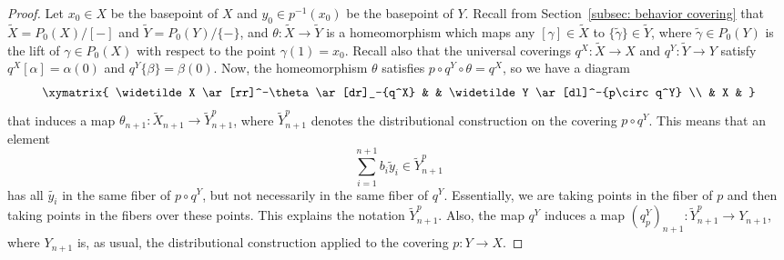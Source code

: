 \documentclass[amscd,amssymb,verbatim,11pt]{amsart}
\theoremstyle{plain}
\theoremstyle{definition}
\newcommand{\Wi}{\widetilde}
\begin{document}
\begin{proof}
    Let $x_0\in X$ be the basepoint of $X$ and $y_0\in p^{-1}(x_0)$ be the basepoint of $Y$. Recall from Section~\ref{subsec: behavior covering} that $\Wi{X}=P_0(X)/[-]$ and $\Wi{Y}=P_0(Y)/\{-\}$, and $\theta\colon \Wi X\to\Wi Y$ is a homeomorphism which maps any $[\gamma]\in \Wi X$ to $\{\Wi{\gamma}\}\in \Wi Y$, where $\Wi{\gamma}\in P_0(Y)$ is the lift of $\gamma\in P_0(X)$ with respect to the point $\gamma(1)=x_0$. Recall also that the universal coverings $q^X\colon \Wi X\to X$ and $q^Y\colon \Wi Y\to Y$ satisfy $q^X[\alpha]=\alpha(0)$ and $q^Y\{\beta\}=\beta(0)$. Now, the homeomorphism $\theta$ 
satisfies $p\circ q^Y \circ \theta = q^X$, so we have a diagram
$$\xymatrix{
\Wi X \ar[rr]^-\theta \ar[dr]_-{q^X} & & \Wi Y \ar[dl]^-{p\circ q^Y} \\
& X &
} 
$$
that induces a map $\theta_{n+1}\colon \Wi X_{n+1} \to \Wi Y^p_{n+1}$, where $\Wi Y^p_{n+1}$
denotes the distributional construction on the covering $p \circ q^Y$. This means that an element
\[
\sum_{i=1}^{n+1} b_i \Wi{y}_i  \in \Wi Y^p_{n+1}
\]
has all $\Wi{y_i}$ in the same fiber of $p \circ q^Y$, but not necessarily in the same fiber
of $q^Y$. Essentially, we are taking points in the fiber of $p$ and then taking points in 
the fibers over these points. 
This explains the notation $\Wi Y^p_{n+1}$. Also, the map $q^Y$ induces a map $(q^Y_p)_{n+1} 
\colon \Wi Y^p_{n+1} \to Y_{n+1}$, where $Y_{n+1}$ is, as usual, the distributional construction applied to the covering $p\colon Y \to X$. 


\end{proof}
\end{document}
